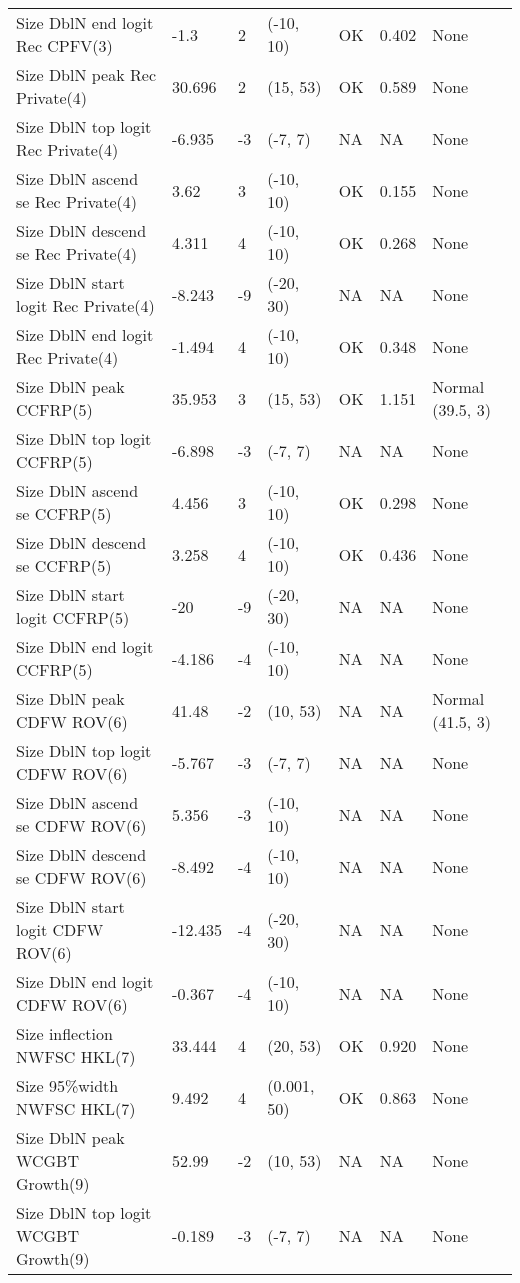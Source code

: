 \documentclass[11pt,
  english,
  letterpaper,
]{article}
\begin{document}
\begin{landscape}
\begin{longtable}[t]{>{\raggedright\arraybackslash}p{7.5cm}lllll>{\raggedright\arraybackslash}p{3.5cm}}
Size DblN end logit Rec CPFV(3) & -1.3 & 2 & (-10, 10) & OK & 0.402 & None\\
Size DblN peak Rec Private(4) & 30.696 & 2 & (15, 53) & OK & 0.589 & None\\
Size DblN top logit Rec Private(4) & -6.935 & -3 & (-7, 7) & NA & NA & None\\
Size DblN ascend se Rec Private(4) & 3.62 & 3 & (-10, 10) & OK & 0.155 & None\\
Size DblN descend se Rec Private(4) & 4.311 & 4 & (-10, 10) & OK & 0.268 & None\\
Size DblN start logit Rec Private(4) & -8.243 & -9 & (-20, 30) & NA & NA & None\\
Size DblN end logit Rec Private(4) & -1.494 & 4 & (-10, 10) & OK & 0.348 & None\\
Size DblN peak CCFRP(5) & 35.953 & 3 & (15, 53) & OK & 1.151 & Normal (39.5, 3)\\
Size DblN top logit CCFRP(5) & -6.898 & -3 & (-7, 7) & NA & NA & None\\
Size DblN ascend se CCFRP(5) & 4.456 & 3 & (-10, 10) & OK & 0.298 & None\\
Size DblN descend se CCFRP(5) & 3.258 & 4 & (-10, 10) & OK & 0.436 & None\\
Size DblN start logit CCFRP(5) & -20 & -9 & (-20, 30) & NA & NA & None\\
Size DblN end logit CCFRP(5) & -4.186 & -4 & (-10, 10) & NA & NA & None\\
Size DblN peak CDFW ROV(6) & 41.48 & -2 & (10, 53) & NA & NA & Normal (41.5, 3)\\
Size DblN top logit CDFW ROV(6) & -5.767 & -3 & (-7, 7) & NA & NA & None\\
Size DblN ascend se CDFW ROV(6) & 5.356 & -3 & (-10, 10) & NA & NA & None\\
Size DblN descend se CDFW ROV(6) & -8.492 & -4 & (-10, 10) & NA & NA & None\\
Size DblN start logit CDFW ROV(6) & -12.435 & -4 & (-20, 30) & NA & NA & None\\
Size DblN end logit CDFW ROV(6) & -0.367 & -4 & (-10, 10) & NA & NA & None\\
Size inflection NWFSC HKL(7) & 33.444 & 4 & (20, 53) & OK & 0.920 & None\\
Size 95\%width NWFSC HKL(7) & 9.492 & 4 & (0.001, 50) & OK & 0.863 & None\\
Size DblN peak WCGBT Growth(9) & 52.99 & -2 & (10, 53) & NA & NA & None\\
Size DblN top logit WCGBT Growth(9) & -0.189 & -3 & (-7, 7) & NA & NA & None\\

\end{longtable}
\end{landscape}
\end{document}
